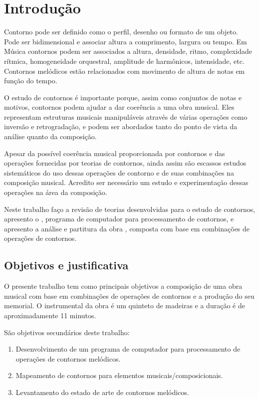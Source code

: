 \chapter{Introdução}
\label{cha:introducao}

Contorno pode ser definido como o perfil, desenho ou formato de um
objeto. Pode ser bidimensional e associar altura a comprimento,
largura ou tempo. Em Música contornos podem ser associados a altura,
densidade, ritmo, complexidade rítmica, homogeneidade orquestral,
amplitude de harmônicos, intensidade, etc. Contornos melódicos estão
relacionados com movimento de altura de notas em função do tempo.

O estudo de contornos é importante porque, assim como conjuntos de
notas e motivos, contornos podem ajudar a dar coerência a uma obra
musical. Eles representam estruturas musicais manipuláveis através de
várias operações como inversão e retrogradação, e podem ser abordados
tanto do ponto de vista da análise quanto da composição.

Apesar da possível coerência musical proporcionada por contornos e das
operações fornecidas por teorias de contornos, ainda assim são
escassos estudos sistemáticos do uso dessas operações de contorno e de
suas combinações na composição musical. Acredito ser necessário um
estudo e experimentação dessas operações na área da composição.

Neste trabalho faço a revisão de teorias desenvolvidas para o estudo
de contornos, apresento o \goiaba{}, programa de computador para
processamento de contornos, e apresento a análise e partitura da obra
\obra{}, composta com base em combinações de operações de contornos.

\section{Objetivos e justificativa}
\label{sec:objet-e-just}

O presente trabalho tem como principais objetivos a composição de uma
obra musical com base em combinações de operações de contornos e a
produção do seu memorial. O instrumental da obra é um quinteto de
madeiras e a duração é de aproximadamente 11 minutos.

São objetivos secundários deste trabalho:

\begin{enumerate}
\item Desenvolvimento de um programa de computador para processamento
  de operações de contornos melódicos.
\item Mapeamento de contornos para elementos musicais/composicionais.
\item Levantamento do estado de arte de contornos melódicos.
\end{enumerate}

